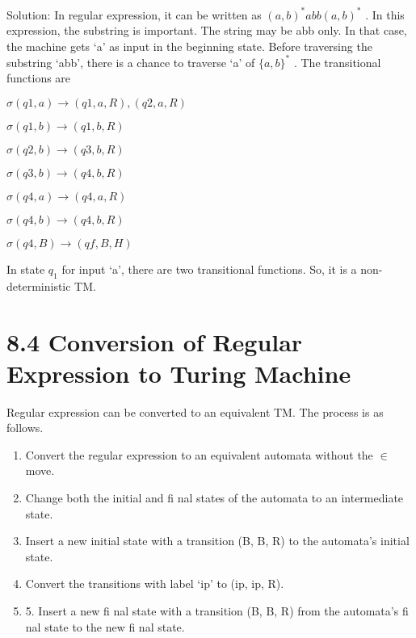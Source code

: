 \documentclass[fontsize=8pt,paper=A4, DIV=9]{scrartcl}
\begin{document}
Solution: In regular expression, it can be written as $(a, b)^{*}
abb(a, b)^{*}$
. In this expression, the substring
is important. The string may be abb only. In that case, the machine gets ‘a’ as input in the beginning
state. Before traversing the substring ‘abb’, there is a chance to traverse ‘a’ of $\lbrace a, b\rbrace^{*}$
. The transitional functions are
\begin{center}
$\sigma(q1, a) \rightarrow (q1, a, R), (q2, a, R)$


$\sigma(q1, b) \rightarrow (q1, b, R)$


$\sigma(q2, b) \rightarrow (q3, b, R)$


$\sigma(q3, b)  \rightarrow (q4, b, R)$


$\sigma(q4, a)  \rightarrow (q4, a, R)$


$\sigma(q4, b) \rightarrow (q4, b, R)$


 $\sigma(q4, B) \rightarrow (qf , B, H)$
\end{center}

In state $q_{1}$
 for input ‘a’, there are two transitional functions. So, it is a non-deterministic TM.

\section*{8.4 Conversion of Regular Expression to Turing Machine}

Regular expression can be converted to an equivalent TM. The process is as follows.
 \begin{enumerate}
 \item  Convert the regular expression to an equivalent automata without the $\in$ move.
 \item  Change both the initial and fi nal states of the automata to an intermediate state.
 \item  Insert a new initial state with a transition (B, B, R) to the automata’s initial state.
 \item   Convert the transitions with label ‘ip’ to (ip, ip, R).
 \item  5. Insert a new fi nal state with a transition (B, B, R) from the automata’s fi nal state to the new
fi nal state.
 \end{enumerate}
 
\end{document}
